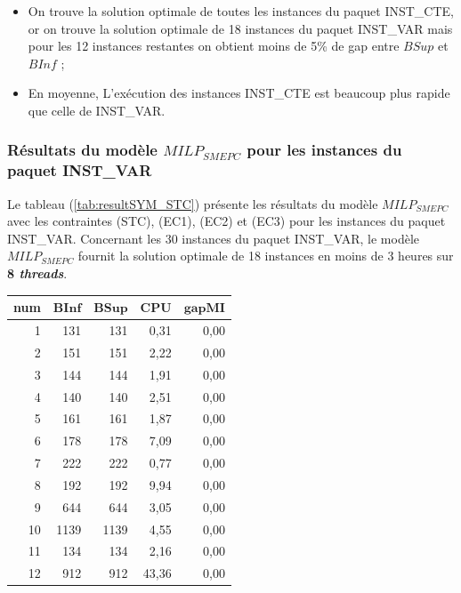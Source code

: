 {\begin{itemize}[label=$\square$]
	\item On trouve la solution optimale de toutes les instances du paquet INST\_CTE, or on trouve la solution optimale de 18 instances du paquet INST\_VAR mais pour les 12 instances restantes on obtient moins de 5\% de gap entre $BSup$ et $BInf$ ;
	\item En moyenne, L'exécution des instances INST\_CTE est beaucoup plus rapide que celle de INST\_VAR.
\end{itemize}
\subsubsection{Résultats du modèle $MILP_{SMEPC}$ pour les instances du paquet INST\_VAR}
Le tableau (\ref{tab:resultSYM_STC}) présente les résultats du modèle $MILP_{SMEPC}$ avec les contraintes (STC), (EC1), (EC2) et (EC3) pour les instances du paquet INST\_VAR.
Concernant les 30 instances du paquet INST\_VAR, le modèle $MILP_{SMEPC}$ fournit la solution optimale de 18 instances en moins de 3 heures sur \textbf{8 \textit{threads}}.%
\begin{table}[H]
	\centering
	\small{
		\begin{tabular}{|r|r|r|r|r|}
			\hline
			\toprule
			\rowcolor{cyan}	\textbf{num} &$\mathbf{BInf}$ & $\mathbf{BSup}$ & $\mathbf{CPU}$ &$\mathbf{gapMI}$  \\
			\midrule
			\hline
		1	&	131	&	131	&	0,31	&	0,00	\\ \hline
		2	&	151	&	151	&	2,22	&	0,00	\\ \hline
		3	&	144	&	144	&	1,91	&	0,00	\\ \hline
		4	&	140	&	140	&	2,51	&	0,00	\\ \hline
		5	&	161	&	161	&	1,87	&	0,00	\\ \hline
		6	&	178	&	178	&	7,09	&	0,00	\\ \hline
		7	&	222	&	222	&	0,77	&	0,00	\\ \hline
		8	&	192	&	192	&	9,94	&	0,00	\\ \hline
		9	&	644	&	644	&	3,05	&	0,00	\\ \hline
		10	&	1139	&	1139	&	4,55	&	0,00	\\ \hline
		11	&	134	&	134	&	2,16	&	0,00	\\ \hline
		12	&	912	&	912	&	43,36	&	0,00	\\ \hline

\end{tabular}}
\end{table}}
